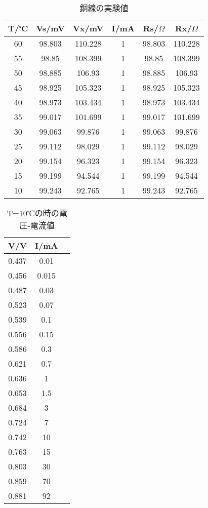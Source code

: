 \documentclass[11pt,a4j]{jsarticle}
\begin{document}
 \begin{table}[htb]
  \begin{center}
    \caption{銅線の実験値}
    \begin{tabular}{cccccc} \toprule
T/℃	&	Vs/mV	&	Vx/mV	&	I/mA	&	Rs/$\Omega$	&	Rx/$\Omega$\\ \midrule
60	&	98.803	&	110.228	&	1	&	98.803	&	110.228\\
55	&	98.85	&	108.399	&	1	&	98.85	&	108.399\\
50	&	98.885	&	106.93	&	1	&	98.885	&	106.93\\
45	&	98.925	&	105.323	&	1	&	98.925	&	105.323\\
40	&	98.973	&	103.434	&	1	&	98.973	&	103.434\\
35	&	99.017	&	101.699	&	1	&	99.017	&	101.699\\
30	&	99.063	&	99.876	&	1	&	99.063	&	99.876\\
25	&	99.112	&	98.029	&	1	&	99.112	&	98.029\\
20	&	99.154	&	96.323	&	1	&	99.154	&	96.323\\
15	&	99.199	&	94.544	&	1	&	99.199	&	94.544\\
10	&	99.243	&	92.765	&	1	&	99.243	&	92.765\\ \bottomrule
    \end{tabular}
    \label{tab:price}
  \end{center}
\end{table}

 \begin{table}[htb]
  \begin{center}
    \caption{T=10℃の時の電圧-電流値}
    \begin{tabular}{ccc} \toprule
V/V	&	I/mA\\ \midrule
0.437	&	0.01\\
0.456	&	0.015\\
0.487	&	0.03\\
0.523	&	0.07\\
0.539	&	0.1\\
0.556	&	0.15\\
0.586	&	0.3\\
0.621	&	0.7\\
0.636	&	1\\
0.653	&	1.5\\
0.684	&	3\\
0.724	&	7\\
0.742	&	10\\
0.763	&	15\\
0.803	&	30\\
0.859	&	70\\
0.881	&	92\\ \bottomrule
    \end{tabular}
    \label{tab:price}
  \end{center}
\end{table}
\end{document}
